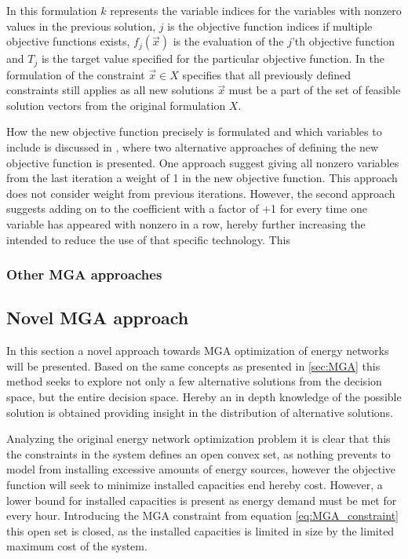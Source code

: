 In this formulation $k$ represents the variable indices for the variables with nonzero values in the previous solution, $j$ is the objective function indices if multiple objective functions exists, $f_j(\vec{x})$ is the evaluation of the $j$'th objective function and $T_j$ is the target value specified for the particular objective function. In the formulation of the constraint $\vec{x}\in X$ specifies that all previously defined constraints still applies as all new solutions $\vec{x}$ must be a part of the set of feasible solution vectors from the original formulation $X$.

How the new objective function precisely is formulated and which variables to include is discussed in \cite{DECAROLIS2016}, where two alternative approaches of defining the new objective function is presented. One approach suggest giving all nonzero variables from the last iteration a weight of 1 in the new objective function. This approach does not consider weight from previous iterations. However, the second approach suggests adding on to the coefficient with a factor of +1 for every time one variable has appeared with nonzero in a row, hereby further increasing the intended to reduce the use of that specific technology. This 



\subsubsection{Other MGA approaches}

\subsection{Novel MGA approach}
In this section a novel approach towards MGA optimization of energy networks will be presented. Based on the same concepts as presented in \ref{sec:MGA} this method seeks to explore not only a few alternative solutions from the decision space, but the entire decision space. Hereby an in depth knowledge of the possible solution is obtained providing insight in the distribution of alternative solutions. 

Analyzing the original energy network optimization problem it is clear that this the constraints in the system defines an open convex set, as nothing prevents to model from installing excessive amounts of energy sources, however the objective function will seek to minimize installed capacities end hereby cost. However, a lower bound for installed capacities is present as energy demand must be met for every hour. 
Introducing the MGA constraint from equation \ref{eq:MGA_constraint} this open set is closed, as the installed capacities is limited in size by the limited maximum cost of the system. 

